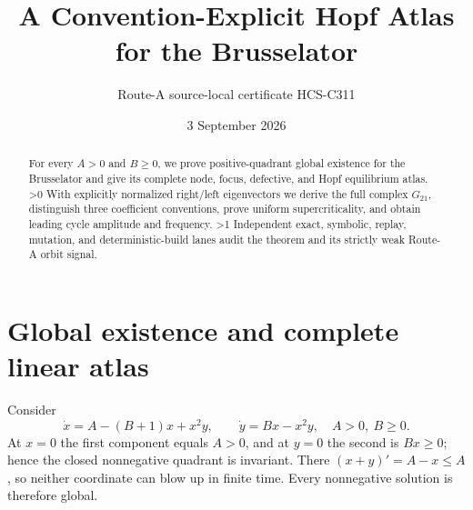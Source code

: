 \documentclass[10pt]{article}
\title{A Convention-Explicit Hopf Atlas for the Brusselator}
\author{Route-A source-local certificate HCS-C311}
\date{3 September 2026}
\providecommand{\CRevisionRound}{2}
\begin{document}
\maketitle
\begin{abstract}
For every $A>0$ and $B\ge0$, we prove positive-quadrant global existence for
the Brusselator and give its complete node, focus, defective, and Hopf
equilibrium atlas.
\ifnum\CRevisionRound>0
With explicitly normalized right/left eigenvectors we derive the full complex
$G_{21}$, distinguish three coefficient conventions, prove uniform
supercriticality, and obtain leading cycle amplitude and frequency.
\fi
\ifnum\CRevisionRound>1
Independent exact, symbolic, replay, mutation, and deterministic-build lanes
audit the theorem and its strictly weak Route-A orbit signal.
\fi
\end{abstract}

\section{Global existence and complete linear atlas}
Consider
\begin{equation}\label{eq:model}
 \dot x=A-(B+1)x+x^2y,\qquad \dot y=Bx-x^2y,
 \quad A>0,\ B\ge0.
\end{equation}
At $x=0$ the first component equals $A>0$, and at $y=0$ the second is
$Bx\ge0$; hence the closed nonnegative quadrant is invariant.  There
$(x+y)'=A-x\le A$, so neither coordinate can blow up in finite time.
Every nonnegative solution is therefore global.
\end{document}
